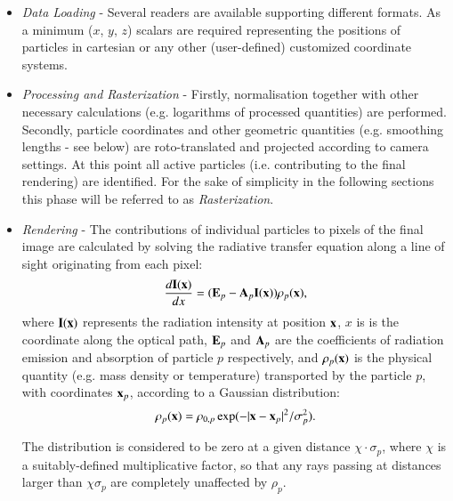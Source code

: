 \documentclass[1p]{elsarticle}
\begin{document}
\begin{itemize}
\item
{\it Data Loading} - Several readers are available supporting different formats. As a minimum ($x$, $y$, $z$) scalars are required representing the positions of particles in cartesian or any other (user-defined) customized coordinate systems.
\item
{\it Processing and Rasterization} - Firstly, normalisation together with other necessary 
calculations (e.g. logarithms of processed quantities) are performed. Secondly, particle 
coordinates and other geometric quantities (e.g. smoothing lengths - see below) are 
roto-translated and projected according to camera settings. 
At this point all active 
particles (i.e. contributing to the final rendering) are identified.
For the sake of simplicity in the following sections 
this phase will be referred to as {\it Rasterization}.
\item
{\it Rendering} - The contributions of individual particles to pixels of the final 
image are calculated by solving the radiative transfer equation  \cite{1991par..book.....S} along a line of sight originating from each pixel:
\begin{equation}\label{rad}
\frac{d{\bf I}{(\bf x})}{dx}=({\bf E}_p-{\bf A}_p{\bf I}({\bf x}))\rho_p({\bf x}),
\end{equation}
where ${\bf I}({\bf x})$ represents the radiation intensity at position ${\bf x}$, $x$ is is the coordinate along the optical path,  ${\bf E}_p$ and ${\bf A}_p$ are the coefficients of radiation emission and absorption of particle $p$ respectively, and $\rho_p({\bf x})$ is the physical quantity (e.g. mass density or temperature) transported by the particle $p$, with coordinates ${\bf x}_p$, according to a Gaussian distribution:
\begin{equation}\label{kernel}
\rho_p({\bf x}) = \rho_{0,p}\exp(-{\vert {\bf x}-{\bf x}_p \vert}^2/\sigma_p^2).
\end{equation}
 
The distribution is considered to be zero at a given distance $\chi\cdot\sigma_p$, where $\chi$ is a suitably-defined multiplicative factor, so that any rays passing at distances larger than $\chi\sigma_p$ are completely unaffected by $\rho_p$.


\end{itemize}
\end{document}
